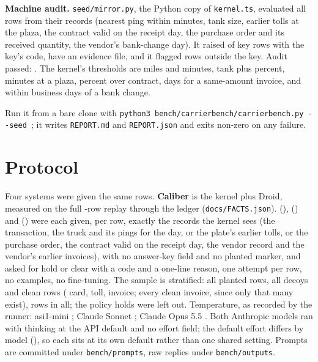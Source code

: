 \documentclass[conference]{IEEEtran}
\newcommand{\code}[1]{\texttt{#1}}
\begin{document}
\textbf{Machine audit.} \code{seed/mirror.py}, the Python copy of \code{kernel.ts}, evaluated all \auditEvaluated{} rows from their records (nearest ping within \thrPingMin{} minutes, tank size, earlier tolls at the plaza, the contract valid on the receipt day, the purchase order and its received quantity, the vendor's bank-change day). It raised \auditInferable{} of \auditRows{} key rows with the key's code, \auditWithFile{} have an evidence file, and it flagged \auditExtra{} rows outside the key. Audit passed: \auditPassed. The kernel's thresholds are \thrMiles{} miles and \thrPingMin{} minutes, tank plus \thrTankPct{} percent, \thrTollMin{} minutes at a plaza, \thrRatePct{} percent over contract, \thrDupDays{} days for a same-amount invoice, and \thrBankUsd{} within \thrBankDays{} business days of a bank change.

Run it from a bare clone with \code{python3 bench/carrierbench/carrierbench.py -{}-seed \benchSeed}; it writes \code{REPORT.md} and \code{REPORT.json} and exits non-zero on any failure.

\section{Protocol}

Four systems were given the same rows. \textbf{Caliber} is the kernel plus Droid, measured on the full \caliberRowsEvaluated-row replay through the ledger (\code{docs/FACTS.json}). \textbf{\sonnetLabel} (\sonnetModel), \textbf{\opusLabel} (\opusModel) and \textbf{\asiLabel} (\asiModel) were each given, per row, exactly the records the kernel sees (the transaction, the truck and its pings for the day, or the plate's earlier tolls, or the purchase order, the contract valid on the receipt day, the vendor record and the vendor's earlier invoices), with no answer-key field and no planted marker, and asked for hold or clear with a code and a one-line reason, one attempt per row, no examples, no fine-tuning. The sample is stratified: all \basePlanted{} planted rows, all \baseDecoys{} decoys and \baseClean{} clean rows (\baseCleanCard{} card, \baseCleanToll{} toll, \baseCleanInvoice{} invoice; every clean invoice, since only that many exist), \baseRows{} rows in all; the \baseExcludedLimits{} policy holds were left out. Temperature, as recorded by the runner: asi1-mini \asiTemperature; Claude Sonnet \sonnetTemperature; Claude Opus 5.5 \opusTemperature. Both Anthropic models ran with thinking at the API default and no effort field; the default effort differs by model (\opusEffort), so each sits at its own default rather than one shared setting. Prompts are committed under \code{bench/prompts}, raw replies under \code{bench/outputs}.
\end{document}
